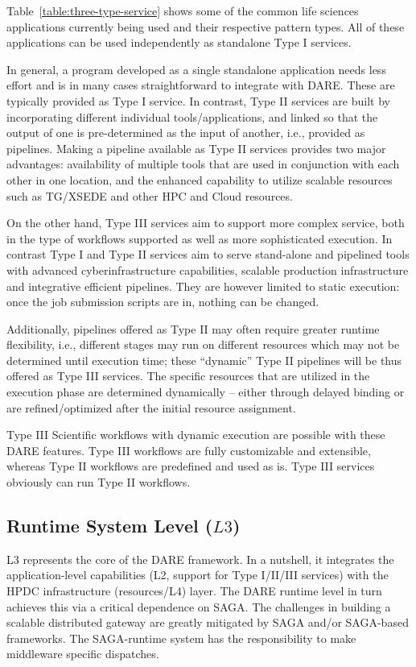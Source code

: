 \documentclass[]{svjour3}
\begin{document}
Table~\ref{table:three-type-service} shows some of the common life sciences
applications currently being used and their respective pattern types. All
of these applications can be used independently as standalone Type I services.

In general, a program developed as a single standalone application needs
less effort and is in many cases straightforward to integrate with
DARE. These are typically provided as Type I service. In contrast,
Type II services are built by incorporating different individual
tools/applications, and linked so that the output of one is
pre-determined as the input of another, i.e., provided as pipelines.
Making a pipeline available as Type II services provides
two major advantages: availability of multiple tools that are used in
conjunction with each other in one location, and the enhanced
capability to utilize scalable resources such as TG/XSEDE and other
HPC and Cloud resources.

On the other hand, Type III services aim to support more complex
service, both in the type of workflows supported as well as more
sophisticated execution. In contrast Type I and Type II
services aim to serve stand-alone and pipelined tools with
advanced cyberinfrastructure capabilities, scalable production infrastructure and
integrative efficient pipelines. They are however limited to static execution:
once the job submission scripts are in, nothing can be changed.

Additionally, pipelines offered as Type II may often require greater
runtime flexibility, i.e., different stages may run on different
resources which may not be determined until execution time; these
``dynamic'' Type II pipelines will be thus offered as Type III
services. The specific resources that are utilized in the
execution phase are determined dynamically -- either through delayed
binding or are refined/optimized after the initial resource
assignment.

Type III Scientific workflows with dynamic execution are possible with
these DARE features. Type III workflows are fully customizable and
extensible, whereas Type II workflows are predefined and used as is.
Type III services obviously can run Type II workflows.

\subsection{Runtime System Level ($L3$)}

L3 represents the core of the DARE framework. In a nutshell, it
integrates the application-level capabilities (L2, support for Type
I/II/III services) with the HPDC infrastructure (resources/L4) layer. The DARE
runtime level in turn achieves this via a critical dependence on
SAGA. The challenges in building a scalable distributed gateway are
greatly mitigated by SAGA and/or SAGA-based frameworks. The
SAGA-runtime system has the responsibility to make middleware specific
dispatches.
\end{document}
